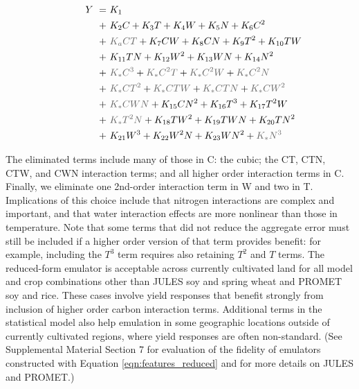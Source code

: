 \documentclass[gmdd]{copernicus} %
\begin{document}
\vspace{-0.3in}
\begin{align}
    \hspace{10mm}  \label{eqn:features_reduced}
        Y\ = \ & K_{1} \\
        + \ & K_{2} C                        + K_{3} T                        + K_{4} W                        + K_{5} N       + K_{6} C^2      \nonumber \\
        + \ & {\color{dark-gray}K_{a} C T}   + K_{7} C W                      + K_{8} C N                      + K_{9} T^2     + K_{10} T W     \nonumber \\
        + \ & K_{11} T N                     + K_{12} W^2                     + K_{13} W N                     + K_{14} N^2                     \nonumber \\
        + \ & {\color{dark-gray}K_{*} C^3}   + {\color{dark-gray}K_{*} C^2 T} + {\color{dark-gray}K_{*} C^2 W} + {\color{dark-gray}K_{*} C^2 N} \nonumber \\
        + \ & {\color{dark-gray}K_{*} C T^2} + {\color{dark-gray}K_{*} C T W} + {\color{dark-gray}K_{*} C T N} + {\color{dark-gray}K_{*} C W^2} \nonumber \\
        + \ & {\color{dark-gray}K_{*} C W N} + K_{15} C N^2                   + K_{16} T^3                     + K_{17} T^2 W                   \nonumber \\
        + \ & {\color{dark-gray}K_{*} T^2 N} + K_{18} T W^2                   + K_{19} T W N                   + K_{20} T N^2                   \nonumber \\
        + \ & K_{21} W^3                     + K_{22} W^2 N                   + K_{23} W N^2                   + {\color{dark-gray}K_{*} N^3}   \nonumber
\end{align}

\noindent The eliminated terms include many of those in C: the cubic; the CT, CTN, CTW, and CWN interaction terms; and all higher order interaction terms in C. 
Finally, we eliminate one 2nd-order interaction term in W and two in T. 
Implications of this choice include that nitrogen interactions are complex and important, and that water interaction effects are more nonlinear than those in temperature.  
Note that some terms that did not reduce the aggregate error must still be included if a higher order version of that term provides benefit: for example, including the $T^3$ term requires also retaining $T^2$ and $T$ terms. 
The reduced-form emulator is acceptable across currently cultivated land for all model and crop combinations other than JULES soy and spring wheat and PROMET soy and rice.
These cases involve yield responses that benefit strongly from inclusion of higher order carbon interaction terms. 
Additional terms in the statistical model also help emulation in some geographic locations outside of currently cultivated regions, where yield responses are often non-standard. 
(See Supplemental Material Section 7 for evaluation of the fidelity of emulators constructed with Equation \ref{eqn:features_reduced} and for more details on JULES and PROMET.)
\end{document}
